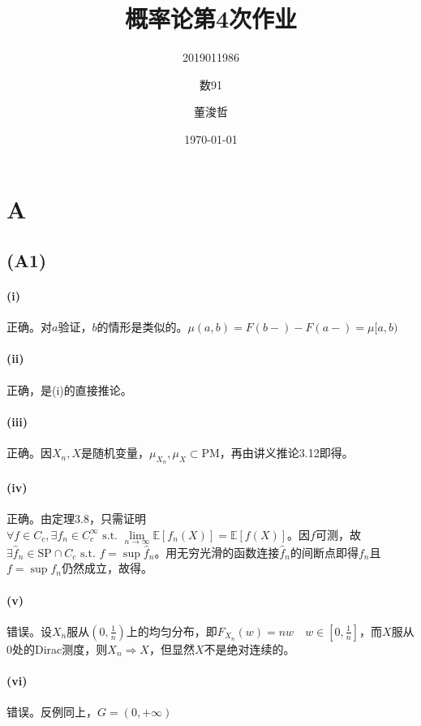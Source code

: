 \documentclass{ctexart}
\title{概率论第4次作业}
\author{2019011986\and 数91\and 董浚哲}
\date{\today}
\begin{document}
\maketitle
\section{A}

\subsection{(A1)}
\paragraph{(i)}
  正确。对$a$验证，$b$的情形是类似的。$\mu(a,b)=F(b-)-F(a-)=\mu[a,b)$

\paragraph{(ii)}
  正确，是(i)的直接推论。

\paragraph{(iii)}
正确。因$X_n,X$是随机变量，$\mu_{X_n},\mu_X\subset \mathrm{PM}$，再由讲义推论3.12即得。

\paragraph{(iv)}
正确。由定理3.8，只需证明$\forall f\in C_c,\exists f_n\in C_c^{\infty}\text{ s.t. } \lim\limits_{n\to\infty}\underset{}{\mathbb{E}}\left[ f_n(X)\right]=\underset{}{\mathbb{E}}\left[ f(X)\right]$。因$f$可测，故$\exists \hat{f}_n\in \mathrm{SP}\cap C_c \text{ s.t. } f=\sup \hat{f}_n$。用无穷光滑的函数连接$\hat{f}_n$的间断点即得$f_n$且$f=\sup f_n$仍然成立，故得。

\paragraph{(v)}
错误。设$X_n$服从$(0,\frac{1}{n})$上的均匀分布，即$F_{X_n}(w)=nw \quad w\in [0,\frac{1}{n}]$，而$X$服从$0$处的Dirac测度，则$X_n\Rightarrow X$，但显然$X$不是绝对连续的。

\paragraph{(vi)}
错误。反例同上，$G=(0,+\infty)$
\end{document}
